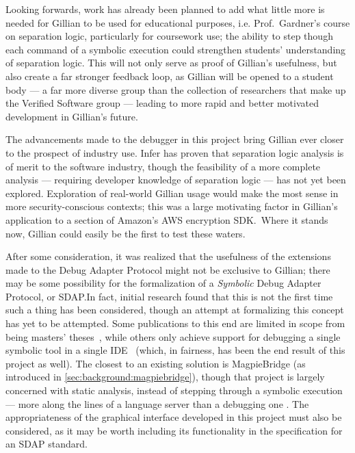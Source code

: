 Looking forwards, work has already been planned to add what little more is
needed for Gillian to be used for educational purposes, i.e. Prof.\ Gardner's
course on separation logic, particularly for coursework use; the ability to step
though each command of a symbolic execution could strengthen students'
understanding of separation logic. This will not only serve as proof of
Gillian's usefulness, but also create a far stronger feedback loop, as Gillian
will be opened to a student body --- a far more diverse group than the
collection of researchers that make up the Verified Software group --- leading
to more rapid and better motivated development in Gillian's future.

The advancements made to the debugger in this project bring Gillian ever closer
to the prospect of industry use. Infer has proven that separation logic analysis
is of merit to the software industry, though the feasibility of a more complete
analysis --- requiring developer knowledge of separation logic --- has not yet
been explored. Exploration of real-world Gillian usage would make the most sense
in more security-conscious contexts; this was a large motivating factor in
Gillian's application to a section of Amazon's AWS encryption SDK.\ Where it
stands now, Gillian could easily be the first to test these waters. 

After some consideration, it was realized that the usefulness of the extensions
made to the Debug Adapter Protocol might not be exclusive to Gillian; there may
be some possibility for the formalization of a \textit{Symbolic} Debug Adapter
Protocol, or SDAP.\@ In fact, initial research found that this is not the first
time such a thing has been considered, though an attempt at formalizing this
concept has yet to be attempted. Some publications to this end are limited in
scope from being masters' theses~\cite{sdap-arxiv, sdap-aurecchia},  while others
only achieve support for debugging a single symbolic tool in a single
IDE~\cite{sdap-colombo, sdap-kps}  (which, in fairness, has been the end result
of this project as well).
The closest to an existing solution is MagpieBridge (as introduced in
\autoref{sec:background:magpiebridge}), though that project is largely concerned
with static analysis, instead of stepping through a symbolic execution --- more
along the lines of a language server than a debugging one .
The appropriateness of the graphical interface developed in this project must
also be considered, as it may be worth including its functionality in the
specification for an SDAP standard.
